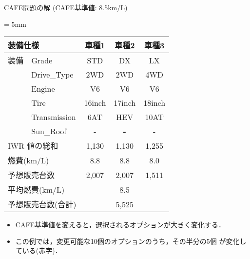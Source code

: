 \documentclass[dvipdfmx, 11pt]{beamer}
\begin{document}
\begin{frame}{CAFE問題の解 {\normalsize (CAFE基準値: 8.5km/L)}}
  \begin{exampleblock}{}
    \centering
    \tabcolsep = 5mm
    \begin{tabular}{l|l|c|c|c} 
      \multicolumn{2}{l|}{装備仕様}  & 車種1 & 車種2  & 車種3 \\\hline
      装備 & \textsf{Grade}  & \textsf{STD} & \textsf{DX}  & \textsf{LX}\\
      &\textsf{Drive\_Type}  & \textsf{2WD}    & \textsf{2WD}    & \alert{4WD}\\
      &\textsf{Engine}	     & \alert{V6}      & \textsf{V6}     & \textsf{V6}\\
      &\textsf{Tire}	     & \textsf{16inch} & \textsf{17inch} & \textsf{18inch}\\
      &\textsf{Transmission} & \alert{6AT}     & \alert{HEV}     & \textsf{10AT}\\
      &\textsf{Sun\_Roof}    & -               & \alert{\bf -}   & -  \\ \hline
      \multicolumn{2}{l|}{IWR 値の総和}           & 1,130  & 1,130   & 1,255 \\ %
      \multicolumn{2}{l|}{燃費(km/L)}      & 8.8  & 8.8     & 8.0 \\ %
      \multicolumn{2}{l|}{予想販売台数}    & 2,007   & 2,007   & 1,511  \\ \hline
      \multicolumn{2}{l|}{平均燃費(km/L)}  & \multicolumn{3}{c}{8.5} \\ 
      \multicolumn{2}{l|}{予想販売台数(合計)}  & \multicolumn{3}{c}{5,525} \\ 
    \end{tabular}
 \end{exampleblock}
 \vfill
 \begin{itemize}
 \item CAFE基準値を変えると，選択されるオプションが大きく変化する．
 \item この例では，変更可能な10個のオプションのうち，その半分の5個
   が変化している(赤字)．
 \end{itemize}
\end{frame}
\end{document}
